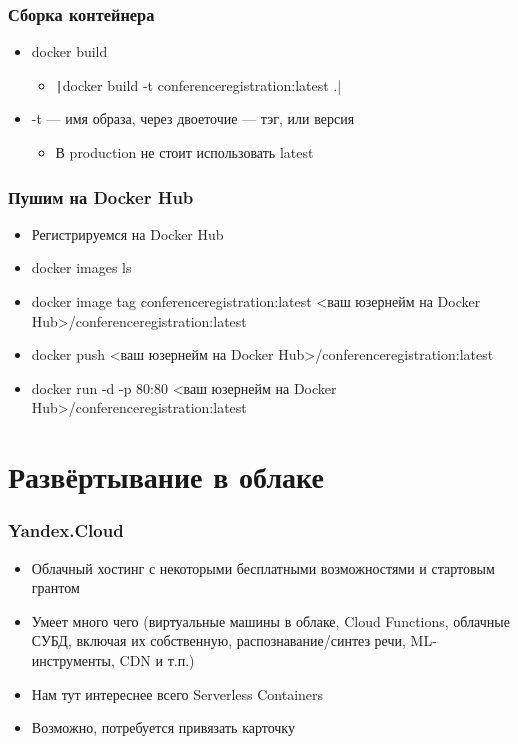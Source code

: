\documentclass{../../slides-style}
\begin{document}
    \begin{frame}
        \frametitle{Сборка контейнера}
        \begin{itemize}
            \item docker build
            \begin{itemize}
                \item \texttt|docker build -t conferenceregistration:latest .|
            \end{itemize}
            \item -t --- имя образа, через двоеточие --- тэг, или версия
            \begin{itemize}
                \item В production не стоит использовать latest
            \end{itemize}
        \end{itemize}
    \end{frame}

    \begin{frame}[fragile]
        \frametitle{Пушим на Docker Hub}
        \begin{itemize}
            \item Регистрируемся на Docker Hub
            \item docker images ls
            \item docker image tag conferenceregistration:latest <ваш юзернейм на Docker Hub>/conferenceregistration:latest
            \item docker push <ваш юзернейм на Docker Hub>/conferenceregistration:latest
            \item docker run -d -p 80:80 <ваш юзернейм на Docker Hub>/conferenceregistration:latest
        \end{itemize}
    \end{frame}

    \section{Развёртывание в облаке}

    \begin{frame}
        \frametitle{Yandex.Cloud}
        \begin{itemize}
            \item Облачный хостинг с некоторыми бесплатными возможностями и стартовым грантом
            \item Умеет много чего (виртуальные машины в облаке, Cloud Functions, облачные СУБД, включая их собственную, распознавание/синтез речи, ML-инструменты, CDN и т.п.)
            \item Нам тут интереснее всего Serverless Containers
            \item Возможно, потребуется привязать карточку
        \end{itemize}
    \end{frame}
\end{document}
